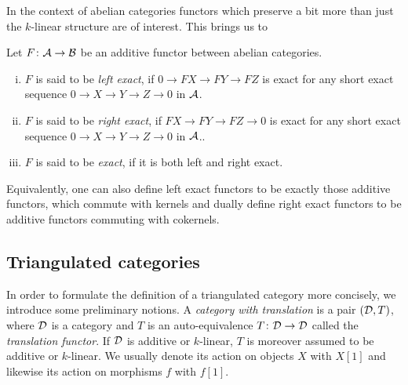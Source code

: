 In the context of abelian categories functors which preserve a bit more than just the $k$-linear structure are of interest. This brings us to

\begin{definition}
    Let $F \colon \mathcal A \to \mathcal B$ be an additive functor between abelian categories. 
    \begin{enumerate}[(i)]
        \item $F$ is said to be \emph{left exact}, if $0 \to FX \to FY \to FZ$ is exact for any short exact sequence $0 \to X \to Y \to Z \to 0$ in $\mathcal A$.
        \item $F$ is said to be \emph{right exact}, if $FX \to FY \to FZ \to 0$ is exact for any short exact sequence $0 \to X \to Y \to Z \to 0$ in $\mathcal A$..
        \item $F$ is said to be \emph{exact}, if it is both left and right exact. 
    \end{enumerate}
\end{definition}

\begin{remark}
    Equivalently, one can also define left exact functors to be exactly those additive functors, which commute with kernels and dually define right exact functors to be additive functors commuting with cokernels.  
\end{remark}

\subsection{Triangulated categories}

In order to formulate the definition of a triangulated category more concisely, we introduce some preliminary notions. A \emph{category with translation} is a pair $(\mathcal D, T)$, where $\mathcal D$ is a category and $T$ is an auto-equivalence $T\colon \mathcal D \to \mathcal D$ called the \emph{translation functor}. If $\mathcal D$ is additive or $k$-linear, $T$ is moreover assumed to be additive or $k$-linear. We usually denote its action on objects $X$ with $X[1]$ and likewise its action on morphisms $f$ with $f[1]$.

